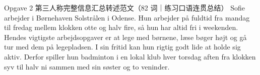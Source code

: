 \begin{emailbox}{Opgave 2 第三人称完整信息汇总转述范文（82 词｜练习口语连贯总结）}
Sofie arbejder i Børnehaven Solstrålen i Odense. Hun arbejder på fuldtid fra mandag til fredag mellem klokken otte og halv fire, så hun har altid fri i weekenden. Hendes vigtigste arbejdsopgaver er at lege med børnene, læse bøger højt og gå tur med dem på legepladsen. I sin fritid kan hun rigtig godt lide at holde sig aktiv. Derfor spiller hun badminton i en lokal klub hver torsdag aften fra klokken syv til halv ni sammen med sin søster og to veninder.
\end{emailbox}
